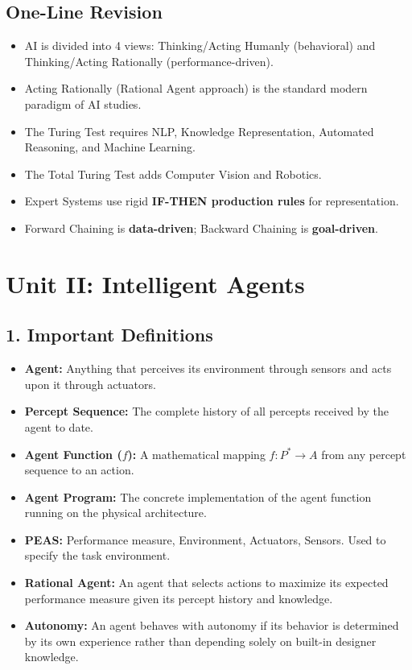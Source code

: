 \subsection{One-Line Revision}
\begin{itemize}
  \item   AI is divided into 4 views: Thinking/Acting Humanly (behavioral) and Thinking/Acting Rationally (performance-driven).
  \item   Acting Rationally (Rational Agent approach) is the standard modern paradigm of AI studies.
  \item   The Turing Test requires NLP, Knowledge Representation, Automated Reasoning, and Machine Learning.
  \item   The Total Turing Test adds Computer Vision and Robotics.
  \item   Expert Systems use rigid \textbf{IF-THEN production rules} for representation.
  \item   Forward Chaining is \textbf{data-driven}; Backward Chaining is \textbf{goal-driven}.
\end{itemize}


\section{Unit II: Intelligent Agents}

\subsection{1. Important Definitions}
\begin{itemize}
  \item   \textbf{Agent:} Anything that perceives its environment through sensors and acts upon it through actuators.
  \item   \textbf{Percept Sequence:} The complete history of all percepts received by the agent to date.
  \item   \textbf{Agent Function ($f$):} A mathematical mapping $f: P^* \rightarrow A$ from any percept sequence to an action.
  \item   \textbf{Agent Program:} The concrete implementation of the agent function running on the physical architecture.
  \item   \textbf{PEAS:} Performance measure, Environment, Actuators, Sensors. Used to specify the task environment.
  \item   \textbf{Rational Agent:} An agent that selects actions to maximize its expected performance measure given its percept history and knowledge.
  \item   \textbf{Autonomy:} An agent behaves with autonomy if its behavior is determined by its own experience rather than depending solely on built-in designer knowledge.
\end{itemize}

